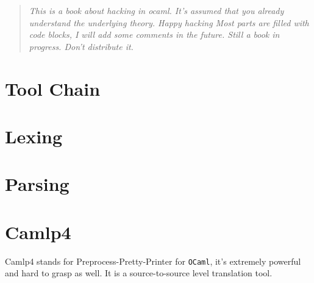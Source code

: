 \documentclass[svgnames,12pt,a4paper]{book}
\begin{document}

\setcounter{tocdepth}{4}




\begin{quotation}
  \textit{This is a book about hacking in ocaml.  It's assumed that
    you already understand the underlying theory. Happy hacking Most
    parts are filled with code blocks, I will add some comments in the
    future. Still a book in progress. Don't distribute it.}

\smiley
\end{quotation}



\newpage

\tableofcontents
\listoftodos
\vspace*{1cm}

\newpage
\newpage 
\chapter{Tool Chain}
 
















\chapter{Lexing}



\chapter{Parsing}
\label{sec:ocamlyacc}



\chapter{Camlp4}
\label{sec:camlp4}
Camlp4 stands for Preprocess-Pretty-Printer for \verb|OCaml|, it's
extremely powerful and  hard to grasp as well. It is a
source-to-source level translation tool.
  
  
  
  
  
  
  
\end{document}
